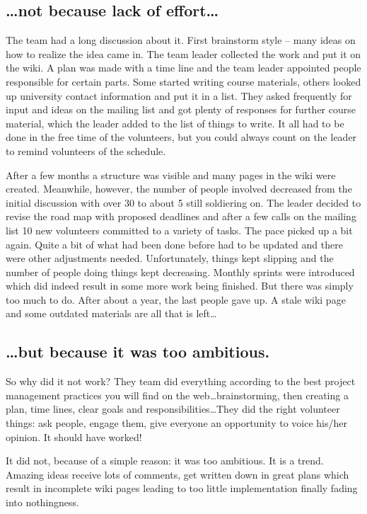 \subsection*{\dots not because lack of effort\dots}
The team had a long discussion about it. First brainstorm style -- many ideas on
how to realize the idea came in. The team leader collected the work and put it
on the wiki. A plan was made with a time line and the team leader appointed
people responsible for certain parts. Some started writing  course materials,
others looked up university contact information and put it in a list. They asked
frequently for input and ideas on the mailing list and got plenty of responses
for further course material, which the leader added to the list of things to
write. It all had to be done in the free time of the volunteers, but you could
always count on the leader to remind volunteers of the schedule.

After a few months a structure was visible and many pages in the wiki were
created. Meanwhile, however, the number of people involved decreased from the
initial discussion with over 30 to about 5 still soldiering on. The leader
decided to revise the road map with proposed deadlines and after a few calls on
the mailing list 10 new volunteers committed to a variety of tasks. The pace
picked up a bit again. Quite a bit of what had been done before had to be
updated and there were other adjustments needed. Unfortunately, things kept
slipping and the number of people doing things kept decreasing. Monthly sprints
were introduced which did indeed result in some more work being finished. But
there was simply too much to do. After about a year, the last people gave up. A
stale wiki page and some outdated materials are all that is left\dots

\subsection*{\dots but because it was too ambitious.}
So why did it not work? They team did everything according to the best project
management practices you will find on the web\dots brainstorming, then creating
a plan, time lines, clear goals and responsibilities\dots They did the right
volunteer things: ask people, engage them, give everyone an opportunity to voice
his/her opinion. It should have worked!

It did not, because of a simple reason: it was too ambitious. It is a trend.
Amazing ideas receive lots of comments, get written down in great plans which
result in incomplete wiki pages leading to too little implementation finally
fading into nothingness.


